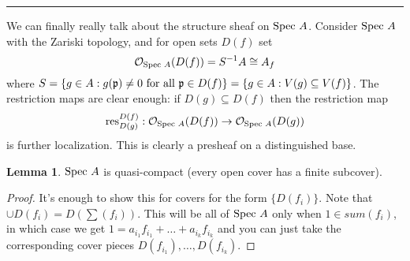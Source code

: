 \documentclass[10pt,reqno]{amsart}
\theoremstyle{definition}
\newtheorem{lemma}[theorem]{Lemma}
\theoremstyle{remark}
\numberwithin{equation}{section}
\numberwithin{theorem}{section}
\newcommand{\OO}{{\mathcal O}}
\newcommand{\res}{\textup{res}}
\newcommand{\spec}{\textup{Spec }}
\newcommand{\pp}{\frak{p}}
\begin{document}
\hrule
\vspace{1em}

We can finally really talk about the structure sheaf on $\spec A$. Consider $\spec A$ with the Zariski topology, and for open sets $D(f)$ set
\[\OO_{\spec A}(D(f)) = S^{-1}A \cong A_f\]
 where $S = \{g \in A: g(\pp) \ne 0 \textup{ for all }\pp \in D(f)\} = \{g \in A: V(g) \subseteq V(f)\}$. The restriction maps are clear enough: if $D(g) \subseteq D(f)$ then the restriction map
 \[\res^{D(f)}_{D(g)}: \OO_{\spec A}(D(f)) \to \OO_{\spec A}(D(g))\]
 is further localization. This is clearly a presheaf on a distinguished base.
 
 \begin{lemma} $\spec A$ is quasi-compact (every open cover has a finite subcover).
 \end{lemma} 
 \begin{proof} It's enough to show this for covers for the form $\{D(f_i)\}$. Note that $\cup D(f_i) = D(\sum (f_i))$. This will be all of $\spec A$ only when $1 \in sum (f_i)$, in which case we get $1 = a_{i_1}f_{i_1} + \dots + a_{i_k}f_{i_k}$ and you can just take the corresponding cover pieces $D(f_{i_1}), \dots, D(f_{i_k})$.
 \end{proof}
 
\end{document}
